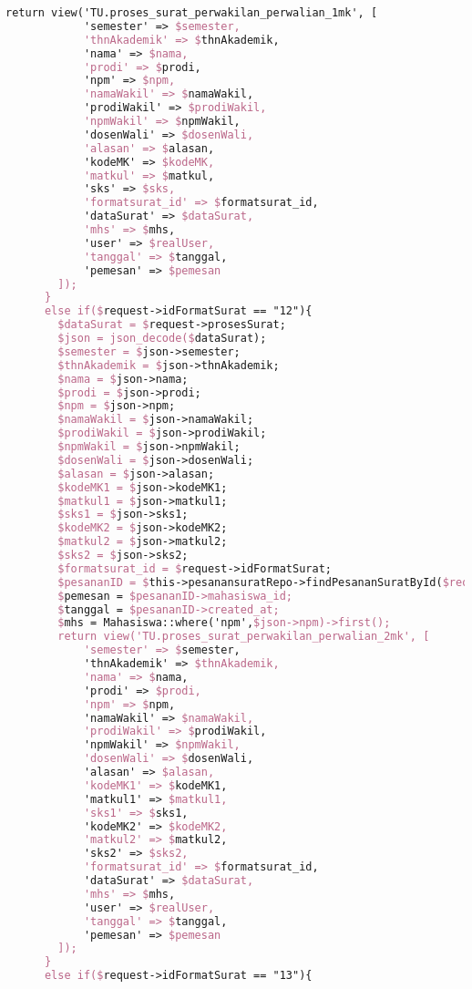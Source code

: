 \begin{lstlisting}[language=tex,basicstyle=\tiny,caption=PesanansuratController.php]
        return view('TU.proses_surat_perwakilan_perwalian_1mk', [
            'semester' => $semester,
            'thnAkademik' => $thnAkademik,
            'nama' => $nama,
            'prodi' => $prodi,
            'npm' => $npm,
            'namaWakil' => $namaWakil,
            'prodiWakil' => $prodiWakil,
            'npmWakil' => $npmWakil,
            'dosenWali' => $dosenWali,
            'alasan' => $alasan,
            'kodeMK' => $kodeMK,
            'matkul' => $matkul,
            'sks' => $sks,
            'formatsurat_id' => $formatsurat_id,
            'dataSurat' => $dataSurat,
            'mhs' => $mhs,
            'user' => $realUser,
            'tanggal' => $tanggal,
            'pemesan' => $pemesan
        ]);
      }
      else if($request->idFormatSurat == "12"){
        $dataSurat = $request->prosesSurat;
        $json = json_decode($dataSurat);
        $semester = $json->semester;
        $thnAkademik = $json->thnAkademik;
        $nama = $json->nama;
        $prodi = $json->prodi;
        $npm = $json->npm;
        $namaWakil = $json->namaWakil;
        $prodiWakil = $json->prodiWakil;
        $npmWakil = $json->npmWakil;
        $dosenWali = $json->dosenWali;
        $alasan = $json->alasan;
        $kodeMK1 = $json->kodeMK1;
        $matkul1 = $json->matkul1;
        $sks1 = $json->sks1;
        $kodeMK2 = $json->kodeMK2;
        $matkul2 = $json->matkul2;
        $sks2 = $json->sks2;
        $formatsurat_id = $request->idFormatSurat;
        $pesananID = $this->pesanansuratRepo->findPesananSuratById($request->id);
        $pemesan = $pesananID->mahasiswa_id;
        $tanggal = $pesananID->created_at;
        $mhs = Mahasiswa::where('npm',$json->npm)->first();
        return view('TU.proses_surat_perwakilan_perwalian_2mk', [
            'semester' => $semester,
            'thnAkademik' => $thnAkademik,
            'nama' => $nama,
            'prodi' => $prodi,
            'npm' => $npm,
            'namaWakil' => $namaWakil,
            'prodiWakil' => $prodiWakil,
            'npmWakil' => $npmWakil,
            'dosenWali' => $dosenWali,
            'alasan' => $alasan,
            'kodeMK1' => $kodeMK1,
            'matkul1' => $matkul1,
            'sks1' => $sks1,
            'kodeMK2' => $kodeMK2,
            'matkul2' => $matkul2,
            'sks2' => $sks2,
            'formatsurat_id' => $formatsurat_id,
            'dataSurat' => $dataSurat,
            'mhs' => $mhs,
            'user' => $realUser,
            'tanggal' => $tanggal,
            'pemesan' => $pemesan
        ]);
      }
      else if($request->idFormatSurat == "13"){

\end{lstlisting}
